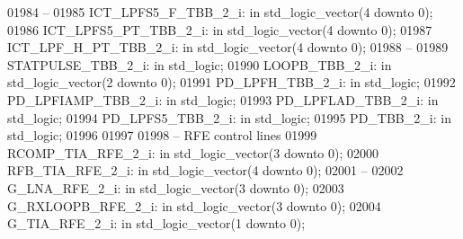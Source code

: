 \begin{DoxyCode}
01984 \textcolor{keyword}{    --}
01985     ICT\_LPFS5\_F\_TBB\_2\_i:    \textcolor{keywordflow}{in} \textcolor{comment}{std\_logic\_vector}(\textcolor{vhdllogic}{}\textcolor{vhdllogic}{4} \textcolor{keywordflow}{downto} \textcolor{vhdllogic}{}\textcolor{vhdllogic}{0});
01986     ICT\_LPFS5\_PT\_TBB\_2\_i:   \textcolor{keywordflow}{in} \textcolor{comment}{std\_logic\_vector}(\textcolor{vhdllogic}{}\textcolor{vhdllogic}{4} \textcolor{keywordflow}{downto} \textcolor{vhdllogic}{}\textcolor{vhdllogic}{0});
01987     ICT\_LPF\_H\_PT\_TBB\_2\_i:   \textcolor{keywordflow}{in} \textcolor{comment}{std\_logic\_vector}(\textcolor{vhdllogic}{}\textcolor{vhdllogic}{4} \textcolor{keywordflow}{downto} \textcolor{vhdllogic}{}\textcolor{vhdllogic}{0});
01988 \textcolor{keyword}{    --}
01989     STATPULSE\_TBB\_2\_i:  \textcolor{keywordflow}{in} \textcolor{comment}{std\_logic};
01990     LOOPB\_TBB\_2\_i:  \textcolor{keywordflow}{in} \textcolor{comment}{std\_logic\_vector}(\textcolor{vhdllogic}{}\textcolor{vhdllogic}{2} \textcolor{keywordflow}{downto} \textcolor{vhdllogic}{}\textcolor{vhdllogic}{0});
01991     PD\_LPFH\_TBB\_2\_i:    \textcolor{keywordflow}{in} \textcolor{comment}{std\_logic};
01992     PD\_LPFIAMP\_TBB\_2\_i: \textcolor{keywordflow}{in} \textcolor{comment}{std\_logic};
01993     PD\_LPFLAD\_TBB\_2\_i:  \textcolor{keywordflow}{in} \textcolor{comment}{std\_logic};
01994     PD\_LPFS5\_TBB\_2\_i:   \textcolor{keywordflow}{in} \textcolor{comment}{std\_logic};
01995     PD\_TBB\_2\_i: \textcolor{keywordflow}{in} \textcolor{comment}{std\_logic};
01996 
01997 
01998 \textcolor{keyword}{    -- RFE control lines}
01999     RCOMP\_TIA\_RFE\_2\_i:  \textcolor{keywordflow}{in} \textcolor{comment}{std\_logic\_vector}(\textcolor{vhdllogic}{}\textcolor{vhdllogic}{3} \textcolor{keywordflow}{downto} \textcolor{vhdllogic}{}\textcolor{vhdllogic}{0});
02000     RFB\_TIA\_RFE\_2\_i:    \textcolor{keywordflow}{in} \textcolor{comment}{std\_logic\_vector}(\textcolor{vhdllogic}{}\textcolor{vhdllogic}{4} \textcolor{keywordflow}{downto} \textcolor{vhdllogic}{}\textcolor{vhdllogic}{0});
02001 \textcolor{keyword}{    --}
02002     G\_LNA\_RFE\_2\_i:  \textcolor{keywordflow}{in} \textcolor{comment}{std\_logic\_vector}(\textcolor{vhdllogic}{}\textcolor{vhdllogic}{3} \textcolor{keywordflow}{downto} \textcolor{vhdllogic}{}\textcolor{vhdllogic}{0});
02003     G\_RXLOOPB\_RFE\_2\_i:  \textcolor{keywordflow}{in} \textcolor{comment}{std\_logic\_vector}(\textcolor{vhdllogic}{}\textcolor{vhdllogic}{3} \textcolor{keywordflow}{downto} \textcolor{vhdllogic}{}\textcolor{vhdllogic}{0});
02004     G\_TIA\_RFE\_2\_i:  \textcolor{keywordflow}{in} \textcolor{comment}{std\_logic\_vector}(\textcolor{vhdllogic}{}\textcolor{vhdllogic}{1} \textcolor{keywordflow}{downto} \textcolor{vhdllogic}{}\textcolor{vhdllogic}{0});

\end{DoxyCode}
